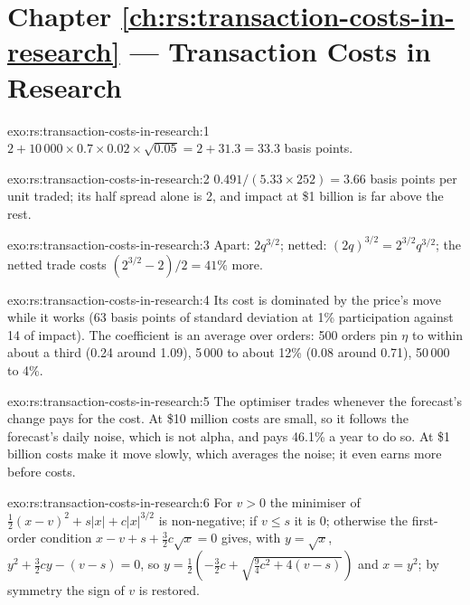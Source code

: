 \section*{Chapter \ref{ch:rs:transaction-costs-in-research} --- Transaction Costs in Research}

\begin{solution}{exo:rs:transaction-costs-in-research:1}
$2 + 10\,000 \times 0.7 \times 0.02 \times \sqrt{0.05} = 2 + 31.3 = 33.3$ basis points.
\end{solution}

\begin{solution}{exo:rs:transaction-costs-in-research:2}
$0.491/(5.33 \times 252) = 3.66$ basis points per unit traded; its half spread alone is 2, and impact at \$1 billion is far above the rest.
\end{solution}

\begin{solution}{exo:rs:transaction-costs-in-research:3}
Apart: $2q^{3/2}$; netted: $(2q)^{3/2} = 2^{3/2}q^{3/2}$; the netted trade costs $(2^{3/2} - 2)/2 = 41\%$ more.
\end{solution}

\begin{solution}{exo:rs:transaction-costs-in-research:4}
Its cost is dominated by the price's move while it works (63 basis points of standard deviation at 1\% participation against 14 of impact). The coefficient is an
average over orders: 500 orders pin $\eta$ to within about a third (0.24 around 1.09), 5\,000 to about 12\% (0.08 around 0.71), 50\,000 to 4\%.
\end{solution}

\begin{solution}{exo:rs:transaction-costs-in-research:5}
The optimiser trades whenever the forecast's change pays for the cost. At \$10 million costs are small, so it follows the forecast's daily noise, which is not
alpha, and pays 46.1\% a year to do so. At \$1 billion costs make it move slowly, which averages the noise; it even earns more before costs.
\end{solution}

\begin{solution}{exo:rs:transaction-costs-in-research:6}
For $v > 0$ the minimiser of $\frac12(x - v)^2 + s\lvert x\rvert + c\lvert x\rvert^{3/2}$ is non-negative; if $v \le s$ it is 0; otherwise the first-order condition
$x - v + s + \frac32 c\sqrt x = 0$ gives, with $y = \sqrt x$, $y^2 + \frac32 cy - (v - s) = 0$, so $y = \frac12(-\frac32 c + \sqrt{\frac94 c^2 + 4(v - s)})$ and
$x = y^2$; by symmetry the sign of $v$ is restored.
\end{solution}

